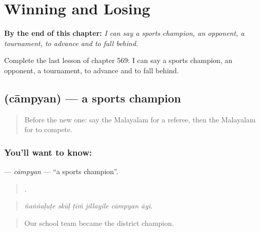 
\chapter{Winning and Losing}
\label{ch:ml-winning-and-losing}

\begin{chapteropening}
\textbf{By the end of this chapter:} \emph{I can say a sports champion, an opponent, a tournament, to advance and to fall behind.}

Complete the last lesson of chapter 569: I can say a sports champion, an opponent, a tournament, to advance and to fall behind.
\end{chapteropening}

\section[\texorpdfstring{\ml{ചാമ്പ്യൻ} (cāmpyan)}{ചാമ്പ്യൻ (cāmpyan)}]{ (cāmpyan) — a sports champion}

\label{lesson:ML-C569-campyan}



\begin{quote}
Before the new one: say the Malayalam for a referee, then the Malayalam for to compete.
\end{quote}

\subsection*{You'll want to know: }
\textbf{} — \emph{cāmpyan} — \textquotedblleft{}a sports champion\textquotedblright{}.

\begin{quote}
     .
\end{quote}

\begin{quote}
\emph{ñaṅṅaḷuṭe skūḷ ṭīṁ jillayile cāmpyan āyi.}
\end{quote}

\begin{quote}
Our school team became the district champion.
\end{quote}

